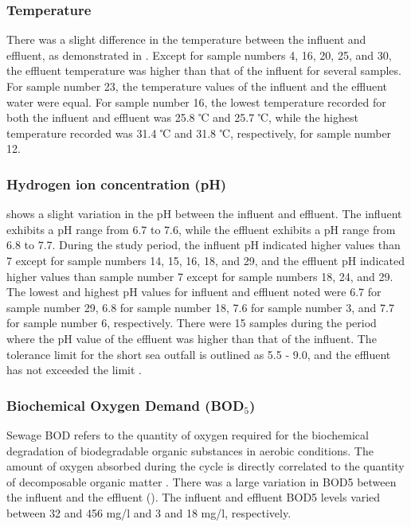 

\subsubsection{Temperature}
There was a slight difference in the temperature between the influent and effluent, as demonstrated in . Except for sample numbers 4, 16, 20, 25, and 30, the effluent temperature was higher than that of the influent for several samples. For sample number 23, the temperature values of the influent and the effluent water were equal. For sample number 16, the lowest temperature recorded for both the influent and effluent was 25.8 ℃ and 25.7 ℃, while the highest temperature recorded was 31.4 ℃ and 31.8 ℃, respectively, for sample number 12.



\subsubsection{Hydrogen ion concentration (pH)}
 shows a slight variation in the pH between the influent and effluent. The influent exhibits a pH range from 6.7 to 7.6, while the effluent exhibits a pH range from 6.8 to 7.7. During the study period, the influent pH indicated higher values than 7 except for sample numbers 14, 15, 16, 18, and 29, and the effluent pH indicated higher values than sample number 7 except for sample numbers 18, 24, and 29. The lowest and highest pH values for influent and effluent noted were 6.7 for sample number 29, 6.8 for sample number 18, 7.6 for sample number 3, and 7.7 for sample number 6, respectively. There were 15 samples during the period where the pH value of the effluent was higher than that of the influent. The tolerance limit for the short sea outfall is outlined as 5.5 - 9.0, and the effluent has not exceeded the limit \cite{CEA2022}.



\subsubsection{Biochemical Oxygen Demand (BOD$_5$)}
Sewage \ac{BOD} refers to the quantity of oxygen required for the biochemical degradation of biodegradable organic substances in aerobic conditions. The amount of oxygen absorbed during the cycle is directly correlated to the quantity of decomposable organic matter \cite{Prasad2020}. There was a large variation in \ac{BOD5} between the influent and the effluent (). The influent and effluent \ac{BOD5} levels varied between 32 and 456 mg/l and 3 and 18 mg/l, respectively. 

